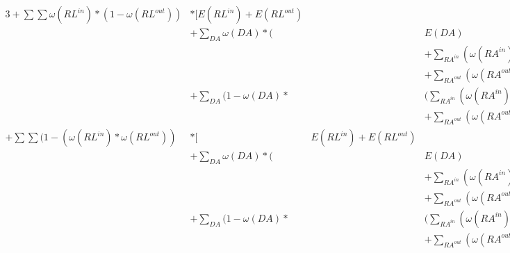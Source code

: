 \documentclass{article}
\begin{document}
\begin{alignat*}{3}
    +\sum \sum \omega(RL^{in})* (1-\omega(RL^{out}))& * \Biggl[E(RL^{in}) + E(RL^{out}) \\
        & +\sum_{DA} \omega(DA) *\Biggl(&&E(DA)\\
            &    &&+ \sum_{RA^{in}}( \omega(RA^{in}) * E(RA^{in}))\\
            &    &&+ \sum_{RA^{out}}( \omega(RA^{out}) * E(RA^{out}))\Biggr)\\
         & +\sum_{DA} (1- \omega(DA) * &&\Biggl(\sum_{RA^{in}}( \omega(RA^{in}) * E(RA^{in})) \\
            &    &&+ \sum_{RA^{out}}( \omega(RA^{out}) * E(RA^{out}))\Biggr) \Biggr]\\
    +\sum \sum (1-(\omega(RL^{in})* \omega(RL^{out}))& * \Biggl[&E(RL^{in}) + E(RL^{out}) \\
        & +\sum_{DA} \omega(DA) *\Biggl(&&E(DA)\\
            &    &&+ \sum_{RA^{in}}( \omega(RA^{in}) * E(RA^{in}))\\
            &    &&+ \sum_{RA^{out}}( \omega(RA^{out}) * E(RA^{out}))\Biggr)\\
        & +\sum_{DA} (1- \omega(DA) * &&\Biggl(\sum_{RA^{in}}( \omega(RA^{in}) * E(RA^{in})) \\
            &    &&+ \sum_{RA^{out}}( \omega(RA^{out}) * E(RA^{out}))\Biggr) \Biggr]\\
\end{alignat*}
\end{document}
